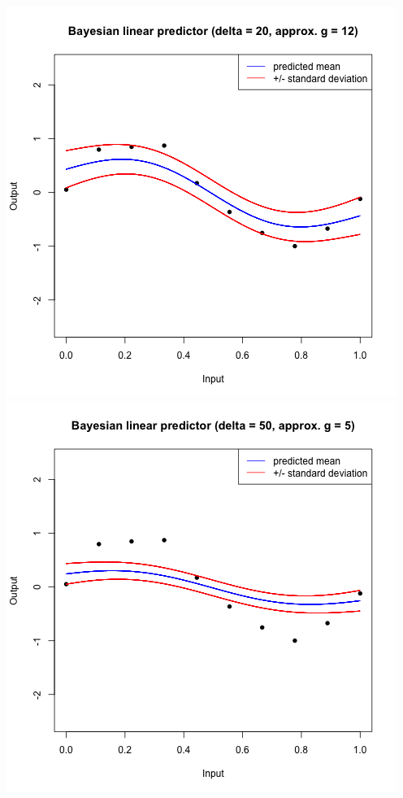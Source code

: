 \documentclass[a4paper, 11pt]{article}
\begin{document}
\begin{center}
\includegraphics[scale=0.6]{ps3F_plot9.png}
\includegraphics[scale=0.6]{ps3F_plot10.png}

\end{center}
\end{document}
